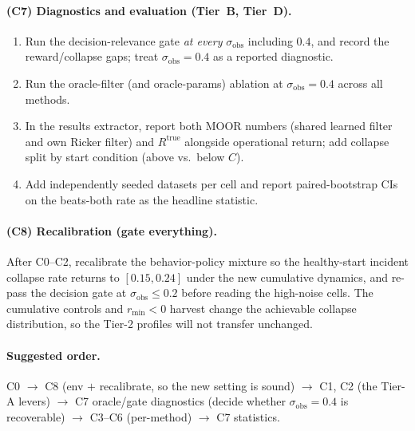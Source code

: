 \documentclass[11pt]{article}
\newcommand{\rmin}{r_{\min}}
\newcommand{\sobs}{\sigma_{\mathrm{obs}}}
\newcommand{\Rtrue}{R^{\mathrm{true}}}
\begin{document}
\paragraph{(C7) Diagnostics and evaluation (Tier~B, Tier~D).}
\begin{enumerate}[leftmargin=1.8em,nosep]
\item Run the decision-relevance gate \emph{at every} $\sobs$ including $0.4$, and
record the reward/collapse gaps; treat $\sobs{=}0.4$ as a reported diagnostic.
\item Run the oracle-filter (and oracle-params) ablation at $\sobs{=}0.4$ across all
methods.
\item In the results extractor, report both MOOR numbers (shared learned filter and
own Ricker filter) and $\Rtrue$ alongside operational return; add collapse split by
start condition (above vs.\ below $C$).
\item Add independently seeded datasets per cell and report paired-bootstrap CIs on
the beats-both rate as the headline statistic.
\end{enumerate}

\paragraph{(C8) Recalibration (gate everything).}
After C0--C2, recalibrate the behavior-policy mixture so the healthy-start incident
collapse rate returns to $[0.15,0.24]$ under the new cumulative dynamics, and
re-pass the decision gate at $\sobs\!\le\!0.2$ before reading the high-noise cells.
The cumulative controls and $\rmin{<}0$ harvest change the achievable collapse
distribution, so the Tier-2 profiles will not transfer unchanged.

\paragraph{Suggested order.} C0 $\to$ C8 (env $+$ recalibrate, so the new setting is
sound) $\to$ C1, C2 (the Tier-A levers) $\to$ C7 oracle/gate diagnostics (decide
whether $\sobs{=}0.4$ is recoverable) $\to$ C3--C6 (per-method) $\to$ C7 statistics.
\end{document}
